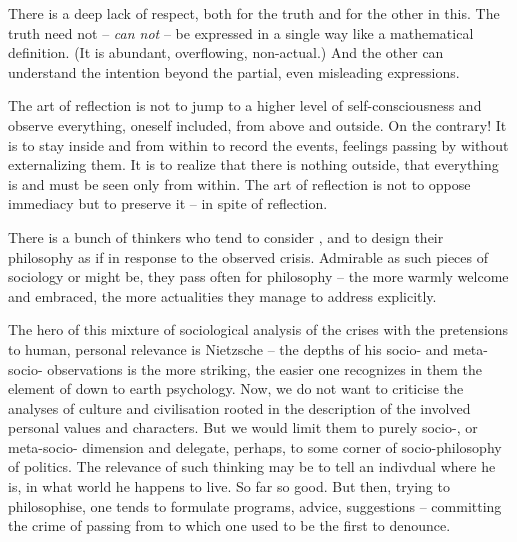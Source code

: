 There is a deep lack of respect, both for the truth and for the other 
in this. The truth need not -- {\em can not} -- be expressed in a 
single way like a mathematical definition. (It is abundant, 
overflowing, non-actual.) And the other can understand the intention beyond 
the partial, even misleading expressions.


The art of reflection is not to jump to a higher level of 
self-consciousness and observe everything, oneself included, from 
above and outside. On the contrary! It is to stay inside and from 
within to record the events, feelings passing by without externalizing 
them. It is to realize that there is nothing outside, that everything 
is and must be seen only from within. The art of reflection is not to 
oppose immediacy but to preserve it -- in spite of reflection.


There is a bunch of thinkers who tend to consider ,  and to design their philosophy
as if in response to the observed crisis. Admirable as such pieces of sociology or
might be, they pass often for philosophy -- the more
warmly welcome and embraced, the more actualities they manage to address
explicitly.

The hero of this mixture of sociological analysis of the crises with the
pretensions to human, personal relevance is Nietzsche -- the depths of his
socio- and meta-socio- observations is the more striking, the easier one
recognizes in them the element of down to earth psychology. Now, we do not want
to criticise the analyses of culture and civilisation rooted in the description
of the involved personal values and characters. But we would limit them to
purely socio-, or meta-socio- dimension and delegate, perhaps, to some corner of
socio-philosophy of politics. 
 The relevance of such thinking may be to tell an 
indivdual where he is, in what world he happens to live. So far so good. But
then, trying to philosophise, one tends to formulate programs, advice,
suggestions -- committing the crime of passing from  to 
which one used to be the first to denounce.



